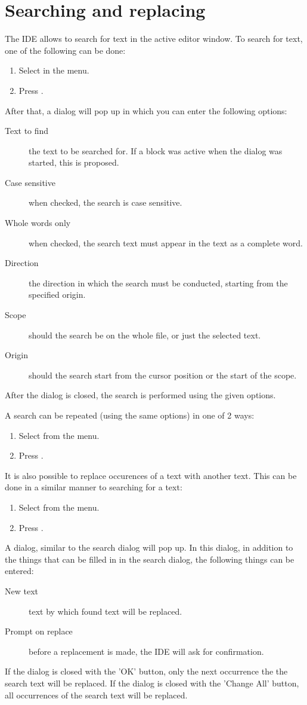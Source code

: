 \section{Searching and replacing}
\label{se:searching}
The IDE allows to search for text in the active editor window. 
To search for text, one  of the following can be done:
\begin{enumerate}
\item Select  in the menu.
\item Press .
\end{enumerate}
After that, a dialog will pop up in which you can enter the following
options:
\begin{description}
\item[Text to find] the text to be searched for. If a block was active when
the dialog was started, this is proposed.
\item[Case sensitive] when checked, the search is case sensitive.
\item[Whole words only] when checked, the search text must appear in the
text as a complete word.
\item[Direction] the direction in which the search must be conducted,
starting from the specified origin.
\item[Scope] should the search be on the whole file, or just the selected
text.
\item[Origin] should the search start from the cursor position or the start
of the scope.
\end{description}
After the dialog is closed, the search is performed using the given options.

A search can be repeated (using the same options) in one of 2 ways:
\begin{enumerate}
\item Select  from the menu.
\item Press .
\end{enumerate}

It is also possible to replace occurences of a text with another text. 
This can be done in a similar manner to searching for a text:
\begin{enumerate}
\item Select  from the menu.
\item Press .
\end{enumerate}
A dialog, similar to the search dialog will pop up.
In this dialog, in addition to the things that can be filled in in the
search dialog, the following things can be entered:
\begin{description}
\item [New text] text by which found text will be replaced.
\item [Prompt on replace] before a replacement is made, the IDE will ask for
confirmation.
\end{description}
If the dialog is closed with the 'OK' button, only the next occurrence the
the search text will be replaced. 
If the dialog is closed with the 'Change All' button, all occurrences of 
the search text will be replaced.

